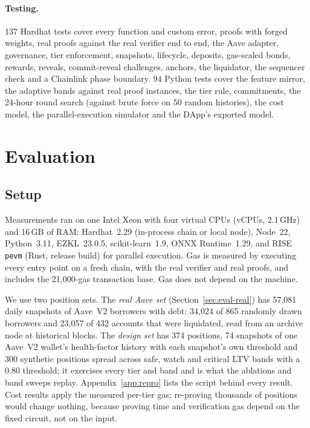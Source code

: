 \documentclass[sigconf,nonacm]{acmart}
\newcommand{\code}[1]{\texttt{\smaller #1}}
\begin{document}
\paragraph{Testing.} 137 Hardhat tests cover every function and custom error, proofs with forged weights, real proofs against the real verifier end to end, the Aave adapter, governance, tier enforcement, snapshots, lifecycle, deposits, gas-scaled bonds, rewards, reveals, commit-reveal challenges, anchors, the liquidator, the sequencer check and a Chainlink phase boundary. 94 Python tests cover the feature mirror, the adaptive bands against real proof instances, the tier rule, commitments, the 24-hour round search (against brute force on 50 random histories), the cost model, the parallel-execution simulator and the DApp's exported model.

\section{Evaluation}
\label{sec:eval}

\subsection{Setup}

Measurements ran on one Intel Xeon with four virtual CPUs (vCPUs, 2.1\,GHz) and 16\,GB of RAM: Hardhat~2.29 (in-process chain or local node), Node~22, Python~3.11, EZKL~23.0.5, scikit-learn~1.9, ONNX Runtime~1.29, and RISE \code{pevm} (Rust, release build) for parallel execution. Gas is measured by executing every entry point on a fresh chain, with the real verifier and real proofs, and includes the 21,000-gas transaction base. Gas does not depend on the machine.

We use two position sets. The \emph{real Aave set} (Section~\ref{sec:eval-real}) has 57,081 daily snapshots of Aave~V2 borrowers with debt: 34,024 of 865 randomly drawn borrowers and 23,057 of 432 accounts that were liquidated, read from an archive node at historical blocks. The \emph{design set} has 374 positions, 74 snapshots of one Aave~V2 wallet's health-factor history with each snapshot's own threshold and 300 synthetic positions spread across safe, watch and critical LTV bands with a 0.80 threshold; it exercises every tier and band and is what the ablations and band sweeps replay. Appendix~\ref{app:repro} lists the script behind every result. Cost results apply the measured per-tier gas; re-proving thousands of positions would change nothing, because proving time and verification gas depend on the fixed circuit, not on the input.
\end{document}
